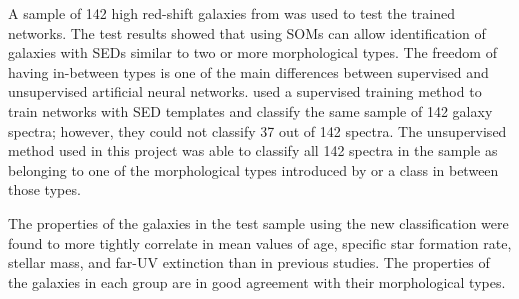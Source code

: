 A sample of 142 high red-shift galaxies from  was used to test the trained networks.
The test results showed that using SOMs can allow identification of galaxies with SEDs similar to two or more morphological types.%
The freedom of having in-between types is one of the main differences between supervised and unsupervised artificial neural networks.
 used a supervised training method to train networks with  SED templates and classify the same sample of 142 galaxy spectra;
however, they could not classify 37 out of 142 spectra.
The unsupervised method used in this project was able to classify  all 142 spectra in the sample
as belonging to one of the morphological types introduced by  or a class in between those types.

The properties of the galaxies in the test sample using the new
classification were found to more tightly correlate in mean values of age, specific star formation rate, stellar mass, and far-UV extinction than in previous studies. 
The properties of the galaxies in each group are in good agreement with their morphological types.



